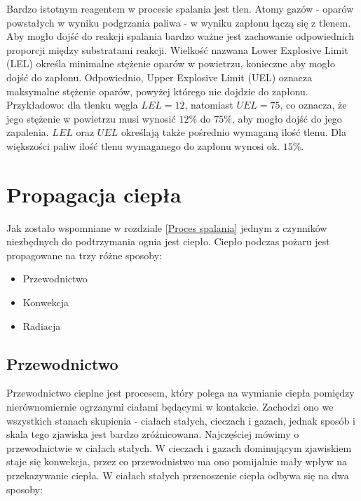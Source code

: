 Bardzo istotnym reagentem w procesie spalania jest tlen. Atomy gazów - oparów powstałych w wyniku podgrzania paliwa - w wyniku zapłonu łączą się z tlenem.
Aby mogło dojść do reakcji spalania bardzo ważne jest zachowanie odpowiednich proporcji między substratami reakcji. Wielkość nazwana Lower Explosive Limit (LEL) określa 
minimalne stężenie oparów w powietrzu, konieczne aby mogło dojść do zapłonu. Odpowiednio, Upper Explosive Limit (UEL) oznacza maksymalne stężenie oparów, powyżej
którego nie dojdzie do zapłonu. Przykładowo: dla tlenku węgla $LEL=12$, natomiast $UEL=75$, co oznacza, że jego stężenie w powietrzu musi wynosić  $12\%$ do $75\%$, aby mogło dojść
do jego zapalenia. $LEL$ oraz $UEL$ określają także pośrednio wymaganą ilość tlenu. Dla większości paliw ilość tlenu wymaganego do zapłonu wynosi ok. $15\%$. 

\section {Propagacja ciepła}
Jak zostało wspomniane w rozdziale \ref{Proces spalania} jednym z czynników niezbędnych
do podtrzymania ognia jest ciepło. Ciepło podczas pożaru jest propagowane na trzy różne sposoby:
\begin {itemize}
\item Przewodnictwo
\item Konwekcja
\item Radiacja
\end {itemize}

\subsection {Przewodnictwo}
\label{Przewodnictwo}
 Przewodnictwo cieplne jest procesem, który polega na wymianie ciepła 
pomiędzy nierównomiernie ogrzanymi ciałami będącymi w kontakcie. Zachodzi ono we wszystkich stanach skupienia - ciałach stałych, cieczach i gazach, jednak sposób i skala tego zjawiska jest bardzo zróżnicowana. Najczęściej mówimy o przewodnictwie w ciałach stałych.
W cieczach i gazach dominującym zjawiskiem staje się konwekcja, przez co przewodnistwo ma ono pomijalnie mały wpływ na przekazywanie ciepła.
W ciałach stałych przenoszenie ciepła odbywa się  na dwa sposoby:

